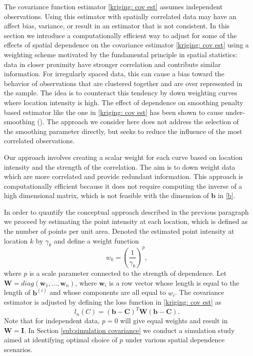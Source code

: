 The covariance function estimator \eqref{kriging: cov est} assumes independent observations. Using this estimator with spatially correlated data may have an affect bias, variance, or result in an estimator that is not consistent. In this section we introduce a computationally efficient way to adjust for some of the effects of spatial dependence on the covariance estimator \ref{kriging: cov est} using a weighting scheme motivated by the fundamental principle in spatial statistics: data in closer proximity have stronger correlation and contribute similar information. For irregularly spaced data, this can cause a bias toward the behavior of observations that are clustered together and are over represented in the sample. The idea is to counteract this tendency by down weighting curves where location intensity is high. The effect of dependence on smoothing penalty based estimator like the one in \eqref{kriging: cov est} has been shown to cause under-smoothing (\cite{Wang:1998tq}). The approach we consider here does not address the selection of the smoothing parameter directly, but seeks to reduce the influence of the most correlated observations. 

Our approach involves creating a scalar weight for each curve based on location intensity and the strength of the correlation. The aim is to down weight data which are more correlated and provide redundant information. This approach is computationally efficient because it does not require computing the inverse of a high dimensional matrix, which is not feasible with the dimension of $\mathbf{b}$ in \eqref{b}.  

In order to quantify the conceptual approach described in the previous paragraph we proceed by estimating the point intensity at each location, which is defined as the number of points per unit area. Denoted the estimated point intensity at location $k$ by $\gamma_k$ and define a weight function 
\begin{equation}
	w_k = \left(\frac{1}{\gamma_k}\right)^p, 
\end{equation}
where $p$ is a scale parameter connected to the strength of dependence.
Let $\mathbf{W}=diag(\mathbf{w}_1, \dots, \mathbf{w}_n)$, where $\mathbf{w}_i$ is a row vector whose length is equal to the length of $\mathbf{b}^{(i)}$ and whose components are all equal to $w_i$. The covariance estimator is adjusted by defining the loss function in \eqref{kriging: cov est} as 
\begin{equation}
	l_{n}(C)= (\mathbf{b} - \mathbf{C})^T\mathbf{W}(\mathbf{b} - \mathbf{C}). \label{eq:diag weighted loss function} 
\end{equation}
Note that for independent data, $p = 0$ will give equal weights and result in $\mathbf{W} = \mathbf{I}$. In Section \ref{sub:simulation covariance} we conduct a simulation study aimed at identifying optimal choice of $p$ under various spatial dependence scenarios. 

